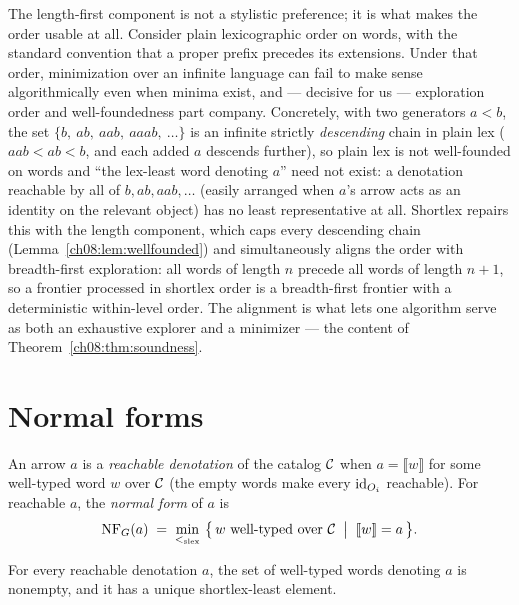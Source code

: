 \begin{remark}\label{ch08:rem:whynotlex}
The length-first component is not a stylistic preference; it is what makes
the order usable at all. Consider plain lexicographic order on words, with
the standard convention that a proper prefix precedes its extensions. Under
that order, minimization over an infinite language can fail to make sense
algorithmically even when minima exist, and --- decisive for us ---
exploration order and well-foundedness part company. Concretely, with two
generators $a<b$, the set $\{b,\ ab,\ aab,\ aaab,\ \dots\}$ is an infinite
strictly \emph{descending} chain in plain lex ($aab<ab<b$, and each added
$a$ descends further), so plain lex is not well-founded on words and
``the lex-least word denoting $a$'' need not exist: a denotation reachable
by all of $b, ab, aab, \dots$ (easily arranged when $a$'s arrow acts as an
identity on the relevant object) has no least representative at all.
Shortlex repairs this with the length component, which caps every
descending chain (Lemma~\ref{ch08:lem:wellfounded}) and simultaneously
aligns the order with breadth-first exploration: all words of length $n$
precede all words of length $n+1$, so a frontier processed in shortlex
order is a breadth-first frontier with a deterministic within-level order.
The alignment is what lets one algorithm serve as both an exhaustive
explorer and a minimizer --- the content of
Theorem~\ref{ch08:thm:soundness}.
\end{remark}

\section{Normal forms}\label{ch08:sec:nf}

\begin{definition}\label{ch08:def:nf}
An arrow $a$ is a \emph{reachable denotation} of the catalog $\mathcal{C}$ when
$a=\llbracket w\rrbracket$ for some well-typed word $w$ over $\mathcal{C}$ (the
empty words make every $\mathrm{id}_{O_i}$ reachable). For reachable $a$, the
\emph{normal form} of $a$ is
\[
\NF_G(a)\;=\;\min_{<_{\mathrm{slex}}}\ \bigl\{\, w \text{ well-typed over }
\cC \;\bigm|\; \llbracket w\rrbracket = a \,\bigr\}.
\]
\end{definition}

\begin{proposition}\label{ch08:prop:nfwelldef}
For every reachable denotation $a$, the set of well-typed words denoting
$a$ is nonempty, and it has a unique shortlex-least element.
\end{proposition}

